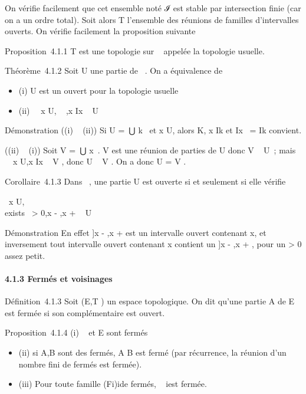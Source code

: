 On vérifie facilement que cet ensemble noté ℐ est stable par
intersection finie (car on a un ordre total). Soit alors T l'ensemble
des réunions de familles d'intervalles ouverts. On vérifie facilement la
proposition suivante

Proposition~4.1.1 T est une topologie sur ~ appelée la topologie
usuelle.

Théorème~4.1.2 Soit U une partie de ~. On a équivalence de

\begin{itemize}
\itemsep1pt\parskip0pt
\item
  (i) U est un ouvert pour la topologie usuelle
\item
  (ii) \forall~~x \in U,
  \existsIx~ ,\quad x \in
  Ix \subset~ U
\end{itemize}

Démonstration ((i) \rigtharrow~ (ii)) Si U =\
⋃  k\inKIk~ et x \in U, alors
\existsk \in K, x \in Ik et Ix~ =
Ik convient.

((ii) \rigtharrow~ (i)) Soit V =\
⋃  x\inUIx~. V est une
réunion de parties de U donc V \subset~ U~; mais \forall~~x \in
U,x \in Ix \subset~ V , donc U \subset~ V . On a donc U = V \inT.

Corollaire~4.1.3 Dans \mathbb{R}~, une partie U est ouverte si et seulement si
elle vérifie

\forall~x \in U, \\exists~\epsilon
\textgreater{} 0,\quad {]}x - \epsilon,x + \epsilon{[}\subset~ U

Démonstration En effet {]}x - \epsilon,x + \epsilon{[} est un intervalle ouvert
contenant x, et inversement tout intervalle ouvert contenant x contient
un {]}x - \epsilon,x + \epsilon{[}, pour un \epsilon \textgreater{} 0 assez petit.

\paragraph{4.1.3 Fermés et voisinages}

Définition~4.1.3 Soit (E,T ) un espace topologique. On dit qu'une partie
A de E est fermée si son complémentaire est ouvert.

Proposition~4.1.4 (i) \varnothing~ et E sont fermés

\begin{itemize}
\itemsep1pt\parskip0pt
\item
  (ii) si A,B sont des fermés, A \cup B est fermé (par récurrence, la
  réunion d'un nombre fini de fermés est fermée).
\item
  (iii) Pour toute famille (Fi)i\inI de fermés,
  \⋂ ~
  i\inIFi est fermée.
\end{itemize}

